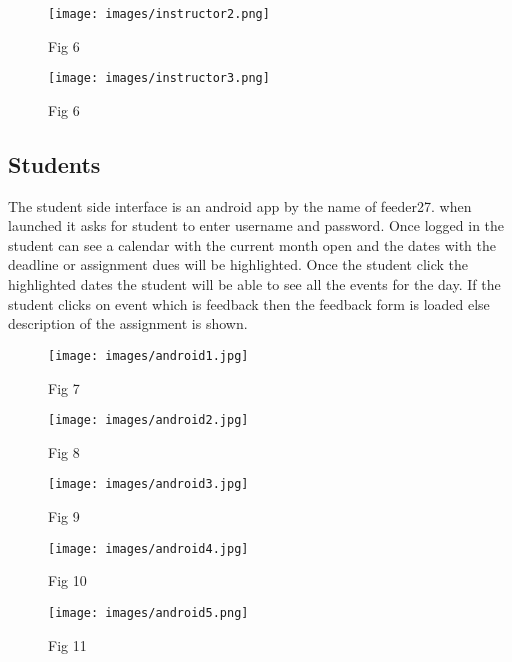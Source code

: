 \documentclass{article}
\begin{document}
\begin{figure}[h!]
\centering
\texttt{[image: images/instructor2.png]}
\caption{Fig 6 \label{overflow}}
\end{figure}

\begin{figure}[h!]
\centering
\texttt{[image: images/instructor3.png]}
\caption{Fig 6 \label{overflow}}
\end{figure}

\subsection{Students}
The student side interface is an android app by the name of feeder27. when launched it asks for student to enter username and password. Once logged in the student can see a calendar with the current month open and the dates with the deadline or assignment dues will be highlighted.
Once the student click the highlighted dates the student will be able to see all the events for the day.
If the student clicks on event which is feedback then the feedback form is loaded else description of the assignment is shown.
\begin{figure}[ht!]
\centering
\texttt{[image: images/android1.jpg]}
\caption{Fig 7 \label{overflow}}
\end{figure}
\begin{figure}[ht!]
\centering
\texttt{[image: images/android2.jpg]}
\caption{Fig 8 \label{overflow}}
\end{figure}
\begin{figure}[ht!]
\centering
\texttt{[image: images/android3.jpg]}
\caption{Fig 9 \label{overflow}}
\end{figure}
\begin{figure}[ht!]
\centering
\texttt{[image: images/android4.jpg]}
\caption{Fig 10 \label{overflow}}
\end{figure}
\begin{figure}[ht!]
\centering
\texttt{[image: images/android5.png]}
\caption{Fig 11 \label{overflow}}
\end{figure}
\end{document}

